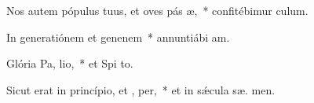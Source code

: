 \item Nos autem pópulus tuus, et oves pás æ,~* confitébimur   culum.
\item In generatiónem et genenem~* annuntiábi  am.
\item Glória Pa,  lio,~* et Spi to.
\item Sicut erat in princípio, et ,  per,~* et in sǽcula sæ. men.
